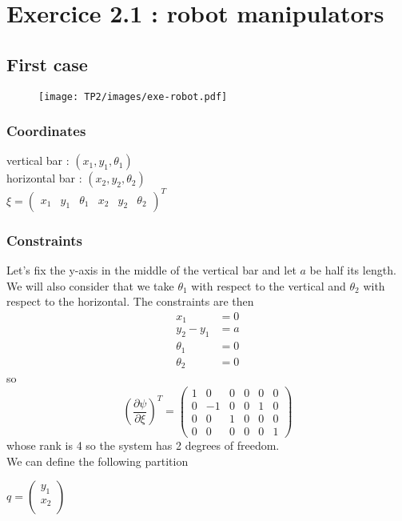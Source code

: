 \section{Exercice 2.1 : robot manipulators}

\subsection{First case}

\begin{figure}[!h]
\texttt{[image: TP2/images/exe-robot.pdf]}
\end{figure}

\subsubsection{Coordinates} vertical bar : $(x_1, y_1, \theta_1)$ \\
horizontal bar : $(x_2, y_2, \theta_2)$ \\
$\xi = \left( \begin{array}{cccccc}
x_1 &  y_1 & \theta_1 & x_2 & y_2 & \theta_2
\end{array} \right)^T$

\subsubsection{Constraints}
Let's fix the y-axis in the middle of the vertical bar and let $ a $ be half its length. We will also consider that we take $ \theta_1$ with respect to the vertical and $\theta_2$ with respect to the horizontal. The constraints are then
\begin{align}
x_1 &= 0\\
y_2 - y_1 &= a \label{contrainty} \\
\theta_1 &= 0\\
\theta_2 &= 0
\end{align}
so
$$(\frac{\partial \psi}{\partial \xi})^T = \left( \begin{array}{cccccc}
1 &  0 & 0 & 0 & 0 & 0\\
0 & -1 & 0 & 0 & 1 & 0\\
0 & 0 & 1 & 0 & 0 & 0\\
0 & 0 & 0 & 0 & 0 & 1
\end{array} \right)$$
whose rank is 4 so the system has 2 degrees of freedom. \\

We can define the following partition

$q = \left( \begin{array}{c}
y_1\\
x_2\\
\end{array} \right)$

